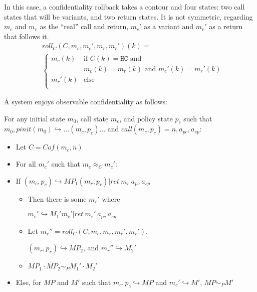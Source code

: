 \documentclass[conference]{IEEEtran}
\newcommand{\MP}{\mathit{MP}}
\begin{document}
      In this case, a confidentiality rollback takes a contour and four states: two call states
      that will be variants, and two return states. It is not symmetric, regarding \(m_c\) and \(m_r\)
      as the ``real'' call and return, \(m_c'\) as a variant and \(m_r'\) as a return that follows it.
      \[\begin{split}
        & \mathit{roll}_C(C,m_c,m_c',m_r,m_r')(k) = \\
        & \begin{cases}
          m_c(k) & \text{if } C(k) = \mathtt{HC} \text{ and } \\
                  & m_c(k) = m_r(k) \text{ and } m_c'(k) = m_r'(k) \\
          m_r'(k) & \text{else} \\
        \end{cases}
      \end{split}\]

      A system enjoys observable confidentiality as follows:

      For any initial state \(m_0\), call state \(m_c\), and policy state \(p_c\) such that
      \(m_0,\mathit{pinit}(m_0) \hookrightarrow ... (m_c,p_c) ...\) and
      \(\mathit{call}(m_c,p_c) = n, a_{pc}, a_{sp}\):

      \begin{itemize}
        \item Let \(C = \mathit{Cof}(m_c,n)\)
        \item For all \(m_c'\) such that \(m_c \approx_C m_c'\):
        \item If \((m_c,p_c) \hookrightarrow \MP_1 (m_r,p_r) | \mathit{ret}\ m_r\ a_{pc}\ a_{sp}\)
          \begin{itemize}
            \item Then there is some \(m_r'\) where

              \(m_c' \hookrightarrow M_1' m_r' | \mathit{ret}\ m_r'\ a_{pc}\ a_{sp}\)
            \item Let \(m_r'' = \mathit{roll}_C(C,m_c,m_r,m_c',m_r')\),

              \((m_r,p_r) \hookrightarrow \MP_2\), and \(m_r'' \hookrightarrow M_2'\)
            \item \(\MP_1 \cdot \MP_2 \sim_P M_1' \cdot M_2'\)
          \end{itemize}
        \item Else, for \(\MP\) and \(M'\) such that \(m_c,p_c \hookrightarrow \MP\) and \(m_c' \hookrightarrow M'\),
          \(\MP \sim_P M'\)
      \end{itemize}
\end{document}
